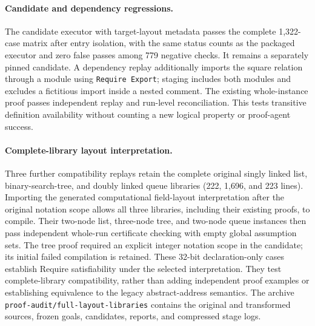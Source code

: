 \paragraph{Candidate and dependency regressions.}
The candidate executor with target-layout metadata passes the complete
1,322-case matrix after entry isolation, with the same status counts as the
packaged executor and zero false passes among 779 negative checks. It remains
a separately pinned candidate. A dependency replay additionally imports the
square relation through a module using \texttt{Require Export}; staging
includes both modules and excludes a fictitious import inside a nested
comment. The existing whole-instance proof passes independent replay and
run-level reconciliation. This tests transitive definition availability without
counting a new logical property or proof-agent success.

\paragraph{Complete-library layout interpretation.}
Three further compatibility replays retain the complete original singly linked
list, binary-search-tree, and doubly linked queue libraries (222, 1,696, and
223 lines). Importing the generated computational field-layout interpretation
after the original notation scope allows all three libraries, including their
existing proofs, to compile. Their two-node list, three-node tree, and two-node
queue instances then pass independent whole-run certificate checking with
empty global assumption sets. The tree proof required an explicit integer
notation scope in the candidate; its initial failed compilation is retained.
These 32-bit declaration-only cases establish Require satisfiability under the
selected interpretation. They test complete-library compatibility, rather
than adding independent proof examples or establishing equivalence to the
legacy abstract-address semantics. The archive
\texttt{proof-audit/full-layout-libraries} contains the original and transformed
sources, frozen goals, candidates, reports, and compressed stage logs.

